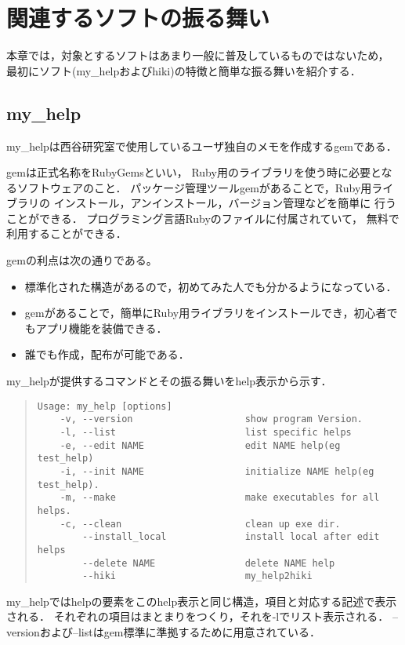\section{関連するソフトの振る舞い}
本章では，対象とするソフトはあまり一般に普及しているものではないため，
最初にソフト(my\_helpおよびhiki)の特徴と簡単な振る舞いを紹介する．

\subsection{my\_help}
my\_helpは西谷研究室で使用しているユーザ独自のメモを作成するgemである．

gemは正式名称をRubyGemsといい，
Ruby用のライブラリを使う時に必要となるソフトウェアのこと\cite{c}．
パッケージ管理ツールgemがあることで，Ruby用ライブラリの
インストール，アンインストール，バージョン管理などを簡単に
行うことができる．
プログラミング言語Rubyのファイルに付属されていて，
無料で利用することができる．

gemの利点は次の通りである。
\begin{itemize}
\item 標準化された構造があるので，初めてみた人でも分かるようになっている．
\item gemがあることで，簡単にRuby用ライブラリをインストールでき，初心者でもアプリ機能を装備できる．
\item 誰でも作成，配布が可能である．
\end{itemize}

my\_helpが提供するコマンドとその振る舞いをhelp表示から示す．
\begin{quote}\begin{verbatim}
Usage: my_help [options]
    -v, --version                    show program Version.
    -l, --list                       list specific helps
    -e, --edit NAME                  edit NAME help(eg test_help)
    -i, --init NAME                  initialize NAME help(eg test_help).
    -m, --make                       make executables for all helps.
    -c, --clean                      clean up exe dir.
        --install_local              install local after edit helps
        --delete NAME                delete NAME help
        --hiki                       my_help2hiki
\end{verbatim}\end{quote}
my\_helpではhelpの要素をこのhelp表示と同じ構造，項目と対応する記述で表示される．
それぞれの項目はまとまりをつくり，それを-lでリスト表示される．
--versionおよび--listはgem標準に準拠するために用意されている．

